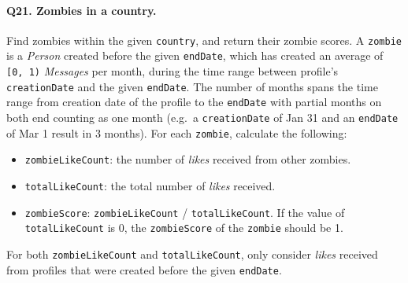 \paragraph{\textbf{Q21}. Zombies in a country.}
Find zombies within the given \texttt{country}, and return their zombie
scores. A \texttt{zombie} is a \emph{Person} created before the given
\texttt{endDate}, which has created an average of \texttt{{[}0,\ 1)}
\emph{Messages} per month, during the time range between profile's
\texttt{creationDate} and the given \texttt{endDate}. The number of
months spans the time range from creation date of the profile to the
\texttt{endDate} with partial months on both end counting as one month
(e.g.~a \texttt{creationDate} of Jan 31 and an \texttt{endDate} of Mar 1
result in 3 months).
For each \texttt{zombie}, calculate the following:
\begin{itemize}
\tightlist
\item
  \texttt{zombieLikeCount}: the number of \emph{likes} received from
  other zombies.
\item
  \texttt{totalLikeCount}: the total number of \emph{likes} received.
\item
  \texttt{zombieScore}: \texttt{zombieLikeCount} /
  \texttt{totalLikeCount}. If the value of \texttt{totalLikeCount} is 0,
  the \texttt{zombieScore} of the \texttt{zombie} should be 1.
\end{itemize}
For both \texttt{zombieLikeCount} and \texttt{totalLikeCount}, only
consider \emph{likes} received from profiles that were created before
the given \texttt{endDate}.
